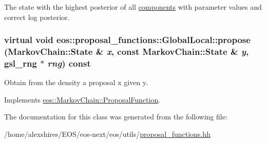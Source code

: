 \label{classeos_1_1proposal__functions_1_1GlobalLocal_abf3e66748628edc462dd5f7b531f4c2b}
The state with the highest posterior of all \hyperlink{namespaceeos_1_1components}{components} with parameter values and correct log posterior. \hypertarget{classeos_1_1proposal__functions_1_1GlobalLocal_a600d45aa7174be9fb264a938de61a568}{
\subsubsection[{propose}]{\setlength{\rightskip}{0pt plus 5cm}virtual void eos::proposal\_\-functions::GlobalLocal::propose ({\bf MarkovChain::State} \& {\em x}, \/  const {\bf MarkovChain::State} \& {\em y}, \/  gsl\_\-rng $\ast$ {\em rng}) const}}
\label{classeos_1_1proposal__functions_1_1GlobalLocal_a600d45aa7174be9fb264a938de61a568}


Obtain from the density a proposal x given y. 

Implements \hyperlink{structeos_1_1MarkovChain_1_1ProposalFunction_a2b296008d32b1cd008e59cde1228705f}{eos::MarkovChain::ProposalFunction}.

The documentation for this class was generated from the following file:\begin{DoxyCompactItemize}
\item 
/home/alexshires/EOS/eos-\/next/eos/utils/\hyperlink{proposal__functions_8hh}{proposal\_\-functions.hh}\end{DoxyCompactItemize}
